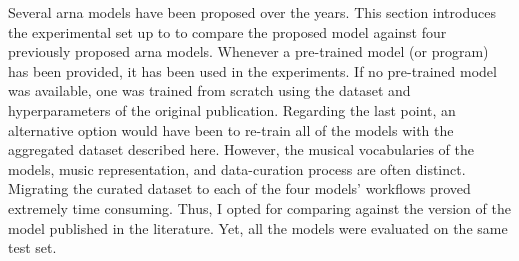 
Several \gls{arna} models have been proposed over the years.
This section introduces the experimental set up to to
compare the proposed model against four previously proposed
\gls{arna} models. Whenever a pre-trained model (or program)
has been provided, it has been used in the experiments. If
no pre-trained model was available, one was trained from
scratch using the dataset and hyperparameters of the
original publication. Regarding the last point, an
alternative option would have been to re-train all of the
models with the aggregated dataset described here. However,
the musical vocabularies of the models, music
representation, and data-curation process are often
distinct. Migrating the curated dataset to each of the four
models' workflows proved extremely time consuming. Thus, I
opted for comparing against the version of the model
published in the literature. Yet, all the models were
evaluated on the same test set.
